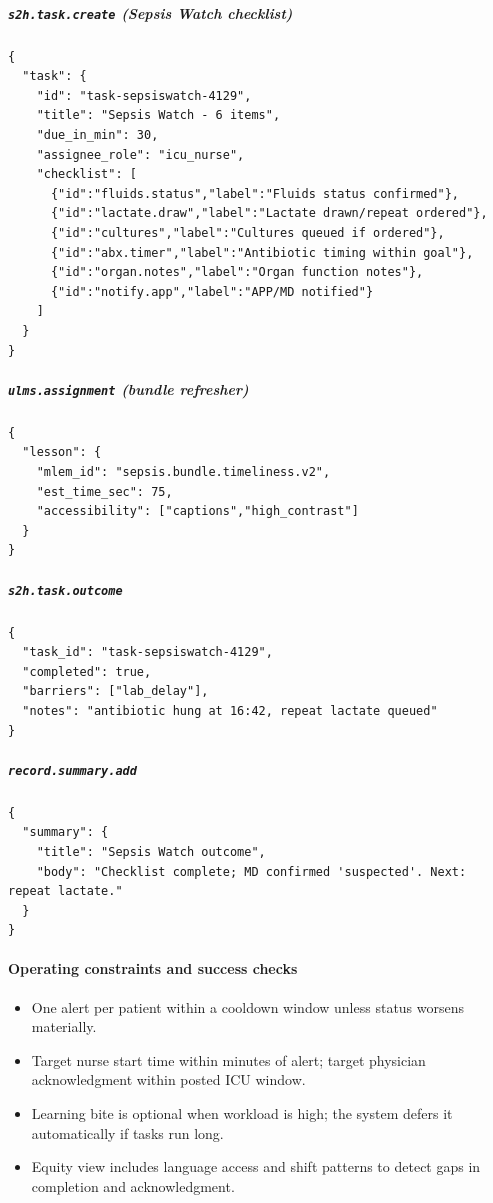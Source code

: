 \documentclass[12pt]{article}
\begin{document}
\subparagraph{\texttt{s2h.task.create} (Sepsis Watch checklist)}
\begin{verbatim}
{
  "task": {
    "id": "task-sepsiswatch-4129",
    "title": "Sepsis Watch - 6 items",
    "due_in_min": 30,
    "assignee_role": "icu_nurse",
    "checklist": [
      {"id":"fluids.status","label":"Fluids status confirmed"},
      {"id":"lactate.draw","label":"Lactate drawn/repeat ordered"},
      {"id":"cultures","label":"Cultures queued if ordered"},
      {"id":"abx.timer","label":"Antibiotic timing within goal"},
      {"id":"organ.notes","label":"Organ function notes"},
      {"id":"notify.app","label":"APP/MD notified"}
    ]
  }
}
\end{verbatim}

\subparagraph{\texttt{ulms.assignment} (bundle refresher)}
\begin{verbatim}
{
  "lesson": {
    "mlem_id": "sepsis.bundle.timeliness.v2",
    "est_time_sec": 75,
    "accessibility": ["captions","high_contrast"]
  }
}
\end{verbatim}

\subparagraph{\texttt{s2h.task.outcome}}
\begin{verbatim}
{
  "task_id": "task-sepsiswatch-4129",
  "completed": true,
  "barriers": ["lab_delay"],
  "notes": "antibiotic hung at 16:42, repeat lactate queued"
}
\end{verbatim}

\subparagraph{\texttt{record.summary.add}}
\begin{verbatim}
{
  "summary": {
    "title": "Sepsis Watch outcome",
    "body": "Checklist complete; MD confirmed 'suspected'. Next: repeat lactate."
  }
}
\end{verbatim}

\paragraph{Operating constraints and success checks}
\begin{itemize}[leftmargin=*]
  \item One alert per patient within a cooldown window unless status worsens materially.
  \item Target nurse start time within minutes of alert; target physician acknowledgment within posted ICU window.
  \item Learning bite is optional when workload is high; the system defers it automatically if tasks run long.
  \item Equity view includes language access and shift patterns to detect gaps in completion and acknowledgment.
\end{itemize}
\end{document}
